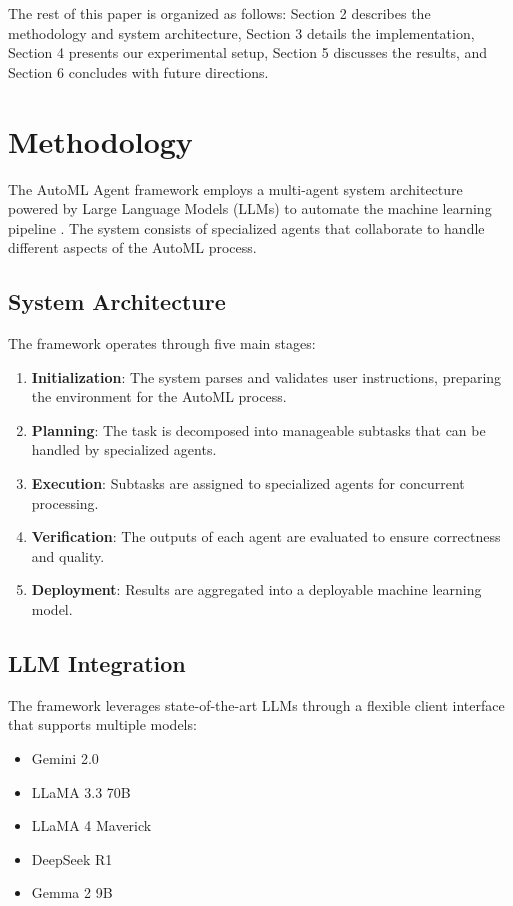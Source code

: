 \documentclass[11pt]{article}
\begin{document}
The rest of this paper is organized as follows: Section 2 describes the methodology and system architecture, Section 3 details the implementation, Section 4 presents our experimental setup, Section 5 discusses the results, and Section 6 concludes with future directions.

\section{Methodology}
The AutoML Agent framework employs a multi-agent system architecture powered by Large Language Models (LLMs) to automate the machine learning pipeline \citep{multi_agent_ml}. The system consists of specialized agents that collaborate to handle different aspects of the AutoML process.

\subsection{System Architecture}
The framework operates through five main stages:
\begin{enumerate}
    \item \textbf{Initialization}: The system parses and validates user instructions, preparing the environment for the AutoML process.
    \item \textbf{Planning}: The task is decomposed into manageable subtasks that can be handled by specialized agents.
    \item \textbf{Execution}: Subtasks are assigned to specialized agents for concurrent processing.
    \item \textbf{Verification}: The outputs of each agent are evaluated to ensure correctness and quality.
    \item \textbf{Deployment}: Results are aggregated into a deployable machine learning model.
\end{enumerate}

\subsection{LLM Integration}
The framework leverages state-of-the-art LLMs through a flexible client interface that supports multiple models:
\begin{itemize}
    \item Gemini 2.0
    \item LLaMA 3.3 70B
    \item LLaMA 4 Maverick
    \item DeepSeek R1
    \item Gemma 2 9B
\end{itemize}
\end{document}
